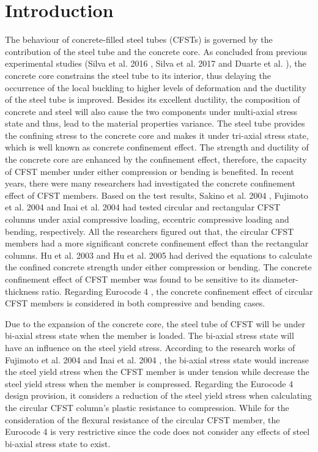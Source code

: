 \documentclass[12pt,a4]{article}
\begin{document}
	\section{Introduction}
	The behaviour of concrete-filled steel tubes (CFSTs) is governed by the contribution of the steel tube and the concrete core. As concluded from previous experimental studies (Silva et al. 2016 \cite{Silva2016}, Silva et al. 2017 \cite{RN140} and Duarte et al. \cite{DUARTE2016274}), the concrete core constrains the steel tube to its interior, thus delaying the occurrence of the local buckling to higher levels of deformation and the ductility of the steel tube is improved. Besides its excellent ductility, the composition of concrete and steel will also cause the two components under multi-axial stress state and thus, lead to the material properties variance. The steel tube provides the confining stress to the concrete core and makes it under tri-axial stress state, which is well known as concrete confinement effect. The strength and ductility of the concrete core are enhanced by the confinement effect, therefore, the capacity of CFST member under either compression or bending is benefited. In recent years, there were many researchers had investigated the concrete confinement effect of CFST members. Based on the test results, Sakino et al. 2004 \cite{RN41}, Fujimoto et al. 2004 \cite{RN15} and Inai et al. 2004 \cite{RN30} had tested circular and rectangular CFST columns under axial compressive loading, eccentric compressive loading and bending, respectively. All the researchers figured out that, the circular CFST members had a more significant concrete confinement effect than the rectangular columns. Hu et al. 2003 \cite{RN1} and Hu et al. 2005 \cite{RN29} had derived the equations to calculate the confined concrete strength under either compression or bending. The concrete confinement effect of CFST member was found to be sensitive to its diameter-thickness ratio. Regarding Eurocode 4 \cite{RN64}, the concrete confinement effect of circular CFST members is considered in both compressive and bending cases.
	\par
	Due to the expansion of the concrete core, the steel tube of CFST will be under bi-axial stress state when the member is loaded. The bi-axial stress state will have an influence on the steel yield stress. According to the research works of Fujimoto et al. 2004 \cite{RN15} and Inai et al. 2004 \cite{RN30}, the bi-axial stress state would increase the steel yield stress when the CFST member is under tension while decrease the steel yield stress when the member is compressed. Regarding the Eurocode 4 \cite{RN64} design provision, it considers a reduction of the steel yield stress when calculating the circular CFST column's plastic resistance to compression. While for the consideration of the flexural resistance of the circular CFST member, the Eurocode 4 is very restrictive since the code does not consider any effects of steel bi-axial stress state to exist.
\end{document}
